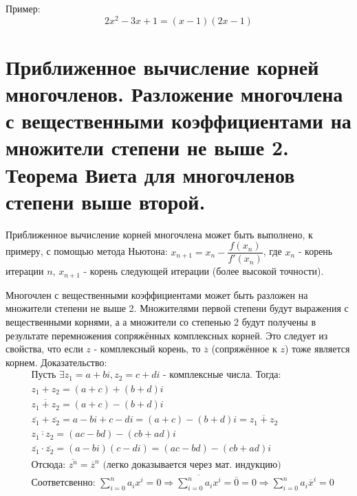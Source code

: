 \documentclass[12pt]{article}
\begin{document}
\begin{sloppypar}
    Пример:
    \[
        2x^2 - 3x + 1 = (x - 1)(2x - 1)
    \]

    \section{Приближенное вычисление корней многочленов. Разложение многочлена с вещественными коэффициентами на множители степени не выше 2. Теорема Виета для многочленов степени выше второй.}
    Приближенное вычисление корней многочлена может быть выполнено, к примеру, с помощью метода Ньютона: $x_{n + 1} = x_n - \dfrac{f(x_n)}{f'(x_n)}$, где $x_n$ - корень итерации $n$, $x_{n + 1}$ - корень следующей итерации (более высокой точности).

    Многочлен с вещественными коэффициентами может быть разложен на множители степени не выше 2. Множителями первой степени будут выражения с вещественными корнями, а а множители со степенью 2 будут получены в результате перемножения сопряжённых комплексных корней. Это следует из свойства, что если $z$ - комплексный корень, то $\overline{z}$ (сопряжённое к $z$) тоже является корнем.
    Доказательство:
    \begin{align*}
         & \text{Пусть } \exists z_1 = a + bi, z_2 = c + di \text{ - комплексные числа. Тогда:}                                                                                  \\
         & z_1 + z_2 = (a + c) + (b + d)i                                                                                                                                        \\
         & \overline{z_1 + z_2} = (a + c) - (b + d)i                                                                                                                             \\
         & \overline{z_1} + \overline{z_2} = a - bi + c - di = (a + c) - (b + d)i = \overline{z_1 + z_2}                                                                         \\
         & \overline{z_1 \cdot z_2} = (ac - bd) - (cb + ad)i                                                                                                                     \\
         & \overline{z_1} \cdot \overline{z_2} = (a - bi)(c - di) = (ac - bd) - (cb + ad)i                                                                                       \\
         & \text{Отсюда: } \overline{z^n} = \overline{z}^n \text{ (легко доказывается через мат. индукцию)}                                                                      \\
         & \text{Соответсвенно: } \sum_{i = 0}^n a_i x^i = 0 \Rightarrow \overline{\sum_{i = 0}^n a_i x^i} = \overline{0} = 0 \Rightarrow{\sum_{i = 0}^n a_i \overline{x}^i = 0}
    \end{align*}


\end{sloppypar}
\end{document}
